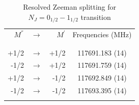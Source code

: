 \begin{table}[!htb]
        \centering
        \caption{Resolved Zeeman splitting for $N_J=0_{1/2}-1_{1/2}$ transition}
        \begin{tabular}{rcrc}
            $M^{''}$ & $\xrightarrow{}$ & $M^{'}$ & Frequencies (MHz)\\
            \\ \hline \hline \\
            +1/2 & $\xrightarrow{}$ & +1/2 & 117691.183 (14) \\
            -1/2 & $\xrightarrow{}$ & +1/2 & 117691.759 (14) \\
            +1/2 & $\xrightarrow{}$ & -1/2 & 117692.849 (14) \\
            -1/2 & $\xrightarrow{}$ & -1/2 & 117693.395 (14) \\
            \hline\\
            
        \end{tabular}
        \label{tab:zeeman}
    \end{table}

